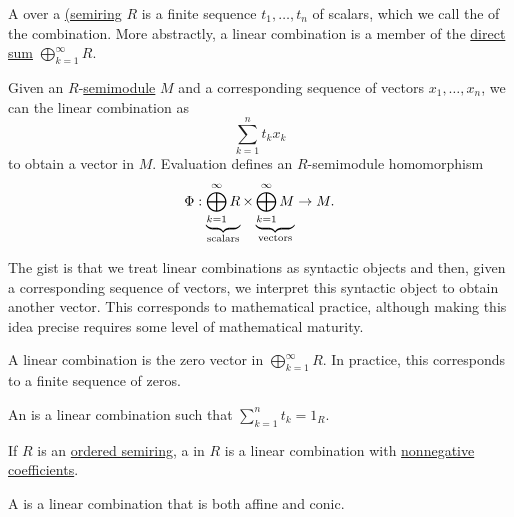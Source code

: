 \begin{definition}\label{def:linear_combination}\mimprovised
  A  over a \hyperref[def:semiring]{(semiring} \( R \) is a finite sequence \( t_1, \ldots, t_n \) of scalars, which we call the  of the combination. More abstractly, a linear combination is a member of the \hyperref[def:semimodule_direct_product]{direct sum} \( \bigoplus_{k=1}^\infty R \).

  Given an \( R \)-\hyperref[def:semimodule]{semimodule} \( M \) and a corresponding sequence of vectors \( x_1, \ldots, x_n \), we can  the linear combination as
  \begin{equation}
    \sum_{k=1}^n t_k x_k
  \end{equation}
  to obtain a vector in \( M \). Evaluation defines an \( R \)-semimodule homomorphism
  \begin{equation*}
    \Phi: \underbrace{\bigoplus_{k=1}^\infty R}_{\T{scalars}} \times \underbrace{\bigoplus_{k=1}^\infty M}_{\T{vectors}} \to M.
  \end{equation*}

  The gist is that we treat linear combinations as syntactic objects and then, given a corresponding sequence of vectors, we interpret this syntactic object to obtain another vector. This corresponds to mathematical practice, although making this idea precise requires some level of mathematical maturity.

  \begin{thmenum}
     A  linear combination is the zero vector in \( \bigoplus_{k=1}^\infty R \). In practice, this corresponds to a finite sequence of zeros.

     An  is a linear combination such that \( \sum_{k=1}^n t_k = 1_R \).

     If \( R \) is an \hyperref[def:ordered_semiring]{ordered semiring}, a  in \( R \) is a linear combination with \hyperref[def:ordered_semiring]{nonnegative coefficients}.

     A  is a linear combination that is both affine and conic.
  \end{thmenum}
\end{definition}

